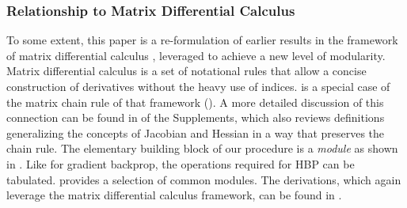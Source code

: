 \subsubsection{Relationship to Matrix Differential Calculus}
\label{hbp::sec:MDF}
To some extent, this paper is a re-formulation of earlier results
\citep{martens2015optimizing,botev2017practical,wei2018bdapch} in the framework
of matrix differential calculus \citep{magnus1999MatrixDifferentialCalculus},
leveraged to achieve a new level of modularity. Matrix differential calculus is
a set of notational rules that allow a concise construction of derivatives
without the heavy use of indices.  is a
special case of the matrix chain rule of that framework
(). A
more detailed discussion of this connection can be found in
 of the Supplements, which also
reviews definitions generalizing the concepts of Jacobian and Hessian in a way
that preserves the chain rule. The elementary building block of our procedure is
a \emph{module} as shown in . Like for gradient
backprop, the operations required for HBP can be tabulated.
 provides a selection of common modules. The
derivations, which again leverage the matrix differential calculus framework,
can be found in
.


